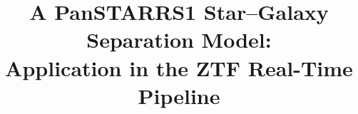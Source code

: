 \documentclass[twocolumn, dvipdfmx]{aastex62}
\begin{document}
\title{A PanSTARRS1 Star--Galaxy Separation Model: \\
       Application in the ZTF Real-Time Pipeline
       }


\end{document}
